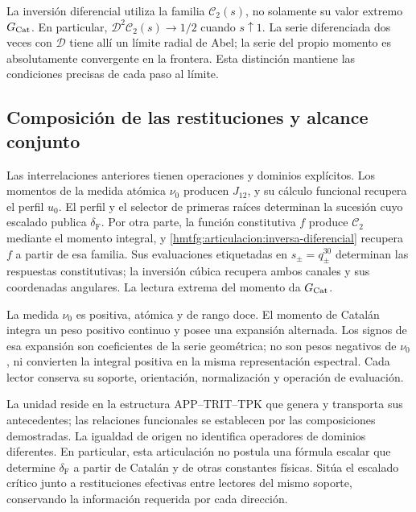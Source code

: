 La inversión diferencial utiliza la familia \(\mathcal C_2(s)\),
no solamente su valor extremo \(G_{\rm Cat}\). En particular,
\(\mathcal D^2\mathcal C_2(s)\to1/2\) cuando \(s\uparrow1\).
La serie diferenciada dos veces con \(\mathcal D\) tiene allí
un límite radial de Abel; la serie del propio momento es
absolutamente convergente en la frontera. Esta distinción mantiene
las condiciones precisas de cada paso al límite.

\subsection{Composición de las restituciones y alcance conjunto}
\label{hmtfg:articulacion:conclusion}

Las interrelaciones anteriores tienen operaciones y dominios
explícitos. Los momentos de la medida atómica \(\nu_0\)
producen \(J_{12}\), y su cálculo funcional recupera el perfil
\(u_0\). El perfil y el selector de primeras raíces determinan
la sucesión cuyo escalado publica \(\delta_{\mathrm F}\).
Por otra parte, la función constitutiva \(f\) produce
\(\mathcal C_2\) mediante el momento integral, y
\eqref{hmtfg:articulacion:inversa-diferencial} recupera \(f\)
a partir de esa familia. Sus evaluaciones etiquetadas en
\(s_\pm=q_\pm^{30}\) determinan las respuestas constitutivas;
la inversión cúbica recupera ambos canales y sus coordenadas
angulares. La lectura extrema del momento da \(G_{\rm Cat}\).

La medida \(\nu_0\) es positiva, atómica y de rango doce.
El momento de Catalán integra un peso positivo continuo y posee
una expansión alternada. Los signos de esa expansión son
coeficientes de la serie geométrica; no son pesos negativos de
\(\nu_0\), ni convierten la integral positiva en la misma
representación espectral. Cada lector conserva su soporte,
orientación, normalización y operación de evaluación.

La unidad reside en la estructura APP--TRIT--TPK que genera y
transporta sus antecedentes; las relaciones funcionales se
establecen por las composiciones demostradas. La igualdad de
origen no identifica operadores de dominios diferentes.
En particular, esta articulación no postula una fórmula escalar
que determine \(\delta_{\mathrm F}\) a partir de Catalán y de
otras constantes físicas. Sitúa el escalado crítico junto a
restituciones efectivas entre lectores del mismo soporte,
conservando la información requerida por cada dirección.
